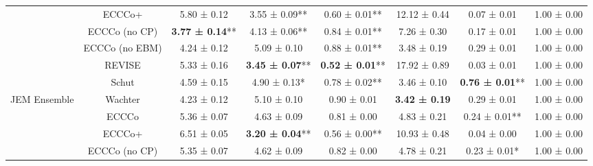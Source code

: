 \begin{table}
{\begin{tabular}[t]{cccccccc}
 & ECCCo+ & 5.80 ± 0.12\hphantom{*}\hphantom{*} & 3.55 ± 0.09** & 0.60 ± 0.01** & 12.12 ± 0.44\hphantom{*}\hphantom{*} & 0.07 ± 0.01\hphantom{*}\hphantom{*} & 1.00 ± 0.00\hphantom{*}\hphantom{*}\\

 & ECCCo (no CP) & \textbf{3.77 ± 0.14}** & 4.13 ± 0.06** & 0.84 ± 0.01** & 7.26 ± 0.30\hphantom{*}\hphantom{*} & 0.17 ± 0.01\hphantom{*}\hphantom{*} & 1.00 ± 0.00\hphantom{*}\hphantom{*}\\

 & ECCCo (no EBM) & 4.24 ± 0.12\hphantom{*}\hphantom{*} & 5.09 ± 0.10\hphantom{*}\hphantom{*} & 0.88 ± 0.01** & 3.48 ± 0.19\hphantom{*}\hphantom{*} & 0.29 ± 0.01\hphantom{*}\hphantom{*} & 1.00 ± 0.00\hphantom{*}\hphantom{*}\\

 & REVISE & 5.33 ± 0.16\hphantom{*}\hphantom{*} & \textbf{3.45 ± 0.07}** & \textbf{0.52 ± 0.01}** & 17.92 ± 0.89\hphantom{*}\hphantom{*} & 0.03 ± 0.01\hphantom{*}\hphantom{*} & 1.00 ± 0.00\hphantom{*}\hphantom{*}\\

 & Schut & 4.59 ± 0.15\hphantom{*}\hphantom{*} & 4.90 ± 0.13*\hphantom{*} & 0.78 ± 0.02** & 3.46 ± 0.10\hphantom{*}\hphantom{*} & \textbf{0.76 ± 0.01}** & 1.00 ± 0.00\hphantom{*}\hphantom{*}\\

\multirow[t]{-7}{*}{\centering\arraybackslash JEM Ensemble} & Wachter & 4.23 ± 0.12\hphantom{*}\hphantom{*} & 5.10 ± 0.10\hphantom{*}\hphantom{*} & 0.90 ± 0.01\hphantom{*}\hphantom{*} & \textbf{3.42 ± 0.19}\hphantom{*}\hphantom{*} & 0.29 ± 0.01\hphantom{*}\hphantom{*} & 1.00 ± 0.00\hphantom{*}\hphantom{*}\\
\cmidrule{1-8}
 & ECCCo & 5.36 ± 0.07\hphantom{*}\hphantom{*} & 4.63 ± 0.09\hphantom{*}\hphantom{*} & 0.81 ± 0.00\hphantom{*}\hphantom{*} & 4.83 ± 0.21\hphantom{*}\hphantom{*} & 0.24 ± 0.01** & 1.00 ± 0.00\hphantom{*}\hphantom{*}\\

 & ECCCo+ & 6.51 ± 0.05\hphantom{*}\hphantom{*} & \textbf{3.20 ± 0.04}** & 0.56 ± 0.00** & 10.93 ± 0.48\hphantom{*}\hphantom{*} & 0.04 ± 0.00\hphantom{*}\hphantom{*} & 1.00 ± 0.00\hphantom{*}\hphantom{*}\\

 & ECCCo (no CP) & 5.35 ± 0.07\hphantom{*}\hphantom{*} & 4.62 ± 0.09\hphantom{*}\hphantom{*} & 0.82 ± 0.00\hphantom{*}\hphantom{*} & 4.78 ± 0.21\hphantom{*}\hphantom{*} & 0.23 ± 0.01*\hphantom{*} & 1.00 ± 0.00\hphantom{*}\hphantom{*}\\


\end{tabular}}
\end{table}
